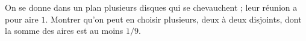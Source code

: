 On se donne dans un plan plusieurs disques qui se chevauchent ; leur réunion a pour aire $1$. Montrer qu'on peut en choisir plusieurs, deux à deux disjoints, dont la somme des aires est au moins $1/9$.
